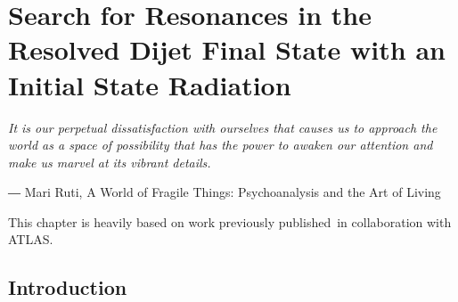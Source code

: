 \chapter{Search for Resonances in the Resolved Dijet Final State with an Initial State Radiation}
\label{chapter:dijetISR}


\epigraph{\textit{It is our perpetual dissatisfaction with ourselves that causes us to approach the world as a space of possibility that has the power to awaken our attention and make us marvel at its vibrant details.}}{― Mari Ruti, A World of Fragile Things: Psychoanalysis and the Art of Living}


This chapter is heavily based on work previously published~\cite{dijetISR2019}in collaboration with ATLAS.

\section{Introduction}

\newcommand{\pt}{\ensuremath{p_{\text{T}}}\xspace}
\newcommand{\MGMCatNLOV}[1]{\textsc{MadGraph5}\_aMC@NLO~#1\xspace}
\newcommand{\PYTHIA}{\textsc{Pythia}\xspace}

\newcommand{\ifb}{\ensuremath(ifb)}
\newcommand{\ptmin}{\ensuremath{\pt^{\textrm{min}}}\xspace}
\newcommand{\nphoton}{\ensuremath{n_{\gamma}}\xspace}
\newcommand{\photonPt}{\ensuremath{E_{\textrm{T}}^{\gamma}}\xspace}
\newcommand{\jetPt}{\ensuremath{p_{\textrm{T}}^{\textrm{jet}}}\xspace}
\newcommand{\ntag}{\ensuremath{n_{\textrm{$b$-tag}}}\xspace}
\newcommand{\mjj}{\ensuremath{m_{\textrm{jj}}}\xspace}
\newcommand{\yStar}{\ensuremath{y^{\ast}}\xspace}
\newcommand{\jetEta}{\ensuremath{\eta^{\textrm{jet}}}\xspace}

\newcommand{\photonPtTrig}{\ensuremath{E_{\textrm{T, trig}}^{\gamma}}\xspace}
\newcommand{\photonEta}{\ensuremath{\eta^{\gamma}}\xspace}
\newcommand{\photonY}{\ensuremath{y^{\gamma}}\xspace}
\newcommand{\photonPhi}{\ensuremath{\phi^{\gamma}}\xspace}
\newcommand{\jetEt}{\ensuremath{E_{\textrm{T}}^{\textrm{jet}}}\xspace}

